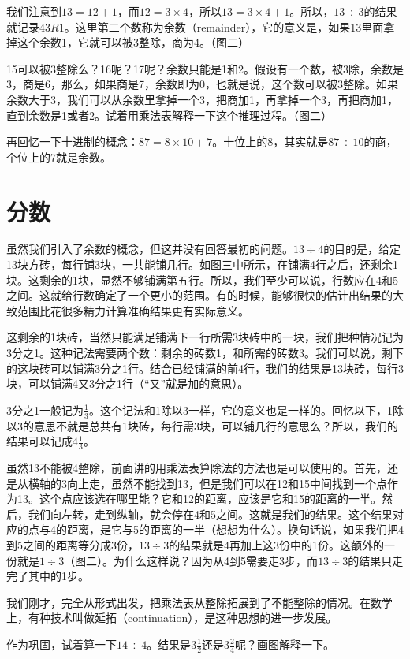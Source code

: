 我们注意到$13 = 12 + 1$，而$12=3\times4$，所以$13 = 3\times4 + 1$。所以，$13\div3$的结果就记录$43R1$。这里第二个数称为余数（remainder），它的意义是，如果13里面拿掉这个余数1，它就可以被3整除，商为4。（图二）

15可以被3整除么？16呢？17呢？余数只能是1和2。假设有一个数，被3除，余数是3，商是6，那么，如果商是7，余数即为0，也就是说，这个数可以被3整除。如果余数大于3，我们可以从余数里拿掉一个3，把商加1，再拿掉一个3，再把商加1，直到余数是1或者2。试着用乘法表解释一下这个推理过程。（图二）

再回忆一下十进制的概念：$87 = 8\times10+7$。十位上的8，其实就是$87\div10$的商，个位上的7就是余数。


\section{分数} 虽然我们引入了余数的概念，但这并没有回答最初的问题。$13\div4$的目的是，给定13块方砖，每行铺3块，一共能铺几行。如图三中所示，在铺满4行之后，还剩余1块。这剩余的1块，显然不够铺满第五行。所以，我们至少可以说，行数应在4和5 之间。这就给行数确定了一个更小的范围。有的时候，能够很快的估计出结果的大致范围比花很多精力计算准确结果更有实际意义。

这剩余的1块砖，当然只能满足铺满下一行所需3块砖中的一块，我们把种情况记为3分之1。这种记法需要两个数：剩余的砖数1，和所需的砖数3。我们可以说，剩下的这块砖可以铺满3分之1行。结合已经铺满的前4行，我们的结果是13块砖，每行3块，可以铺满4又3分之1行（“又”就是加的意思）。

3分之1一般记为$\frac{1}{3}$。这个记法和1除以3一样，它的意义也是一样的。回忆以下，1除以3的意思不就是总共有1块砖，每行需3块，可以铺几行的意思么？所以，我们的结果可以记成$4\frac{1}{3}$。

虽然13不能被4整除，前面讲的用乘法表算除法的方法也是可以使用的。首先，还是从横轴的3向上走，虽然不能找到13，但是我们可以在12和15中间找到一个点作为13。这个点应该选在哪里能？它和12的距离，应该是它和15的距离的一半。然后，我们向左转，走到纵轴，就会停在4和5之间。这就是我们的结果。这个结果对应的点与4的距离，是它与5的距离的一半（想想为什么）。换句话说，如果我们把4到5之间的距离等分成3份，$13\div3$的结果就是4再加上这3份中的1份。这额外的一份就是$1\div3$（图二）。为什么这样说？因为从4到5需要走3步，而$13\div3$的结果只走完了其中的1步。

我们刚才，完全从形式出发，把乘法表从整除拓展到了不能整除的情况。在数学上，有种技术叫做延拓（continuation），是这种思想的进一步发展。

作为巩固，试着算一下$14\div4$。结果是$3\frac{1}{2}$还是$3\frac{2}{4}$呢？画图解释一下。

